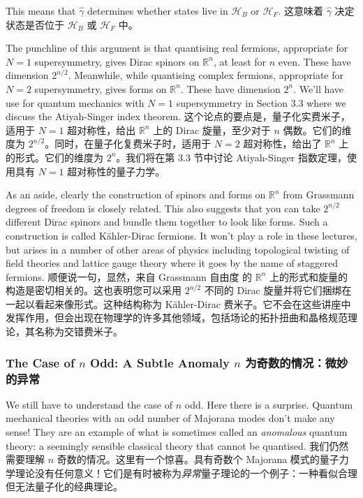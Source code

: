\documentclass{article}
\newcommand{\SakuraiYukiko}{\emoji{cherry-blossom}\emoji{snowflake}}
\begin{document}
This means that $\hat{\gamma}$ determines whether states live in $\mathcal{H}_B$ or $\mathcal{H}_F$.
这意味着 $\hat{\gamma}$ 决定状态是否位于 $\mathcal{H}_B$ 或 $\mathcal{H}_F$ 中。

The punchline of this argument is that quantising real fermions, appropriate for $N = 1$ supersymmetry, gives Dirac spinors on $\mathbb{R}^{n}$, at least for $n$ even. These have dimension $2^{n/2}$. Meanwhile, while quantising complex fermions, appropriate for $N = 2$ supersymmetry, gives forms on $\mathbb{R}^{n}$. These have dimension $2^n$. We'll have use for quantum mechanics with $N = 1$ supersymmetry in Section 3.3 where we discuss the Atiyah-Singer index theorem.
这个论点的要点是，量子化实费米子，适用于 $N = 1$ 超对称性，给出 $\mathbb{R}^{n}$ 上的 Dirac 旋量，至​​少对于 $n$ 偶数。它们的维度为 $2^{n/2}$。同时，在量子化复费米子时，适用于 $N = 2$ 超对称性，给出了 $\mathbb{R}^{n}$ 上的形式。它们的维度为 $2^n$。我们将在第 3.3 节中讨论 Atiyah-Singer 指数定理，使用具有 $N = 1$ 超对称性的量子力学。

As an aside, clearly the construction of spinors and forms on $\mathbb{R}^{n}$ from Grassmann degrees of freedom is closely related. This also suggests that you can take $2^{n/2}$ different Dirac spinors and bundle them together to look like forms. Such a construction is called Kähler-Dirac fermions. It won't play a role in these lectures, but arises in a number of other areas of physics including topological twisting of field theories and lattice gauge theory where it goes by the name of staggered fermions.
顺便说一句，显然，来自 Grassmann 自由度 的 $\mathbb{R}^{n}$ 上的形式和旋量的构造是密切相关的。这也表明您可以采用 $2^{n/2}$ 不同的 Dirac 旋量并将它们捆绑在一起以看起来像形式。这种结构称为 Kähler-Dirac 费米子。它不会在这些讲座中发挥作用，但会出现在物理学的许多其他领域，包括场论的拓扑扭曲和晶格规范理论，其名称为交错费米子。

\subsubsection*{The Case of $n$ Odd: A Subtle Anomaly \SakuraiYukiko $n$ 为奇数的情况：微妙的异常}

We still have to understand the case of $n$ odd. Here there is a surprise. Quantum mechanical theories with an odd number of Majorana modes don't make any sense! They are an example of what is sometimes called an \textit{anomalous} quantum theory: a seemingly sensible classical theory that cannot be quantised.
我们仍然需要理解 $n$ 奇数的情况。这里有一个惊喜。具有奇数个 Majorana 模式的量子力学理论没有任何意义！它们是有时被称为\textit{异常}量子理论的一个例子：一种看似合理但无法量子化的经典理论。
\end{document}
